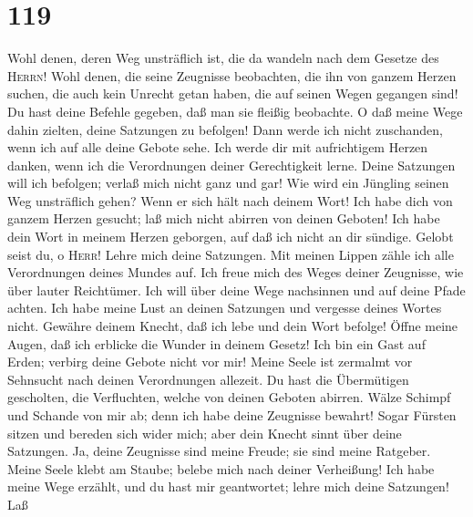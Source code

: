 \hypertarget{section-118}{%
\section{119}\label{section-118}}

 Wohl denen, deren Weg unsträflich ist, die da wandeln
nach dem Gesetze des \textsc{Herrn}!  Wohl denen, die
seine Zeugnisse beobachten, die ihn von ganzem Herzen suchen,
 die auch kein Unrecht getan haben, die auf seinen Wegen
gegangen sind!  Du hast deine Befehle gegeben, daß man sie
fleißig beobachte.  O daß meine Wege dahin zielten, deine
Satzungen zu befolgen!  Dann werde ich nicht zuschanden,
wenn ich auf alle deine Gebote sehe.  Ich werde dir mit
aufrichtigem Herzen danken, wenn ich die Verordnungen deiner
Gerechtigkeit lerne.  Deine Satzungen will ich befolgen;
verlaß mich nicht ganz und gar!  Wie wird ein Jüngling
seinen Weg unsträflich gehen? Wenn er sich hält nach deinem Wort!
 Ich habe dich von ganzem Herzen gesucht; laß mich nicht
abirren von deinen Geboten!  Ich habe dein Wort in meinem
Herzen geborgen, auf daß ich nicht an dir sündige. 
Gelobt seist du, o \textsc{Herr}! Lehre mich deine Satzungen.
 Mit meinen Lippen zähle ich alle Verordnungen deines
Mundes auf.  Ich freue mich des Weges deiner Zeugnisse,
wie über lauter Reichtümer.  Ich will über deine Wege
nachsinnen und auf deine Pfade achten.  Ich habe meine
Lust an deinen Satzungen und vergesse deines Wortes nicht.
 Gewähre deinem Knecht, daß ich lebe und dein Wort
befolge!  Öffne meine Augen, daß ich erblicke die Wunder
in deinem Gesetz!  Ich bin ein Gast auf Erden; verbirg
deine Gebote nicht vor mir!  Meine Seele ist zermalmt vor
Sehnsucht nach deinen Verordnungen allezeit.  Du hast die
Übermütigen gescholten, die Verfluchten, welche von deinen Geboten
abirren.  Wälze Schimpf und Schande von mir ab; denn ich
habe deine Zeugnisse bewahrt!  Sogar Fürsten sitzen und
bereden sich wider mich; aber dein Knecht sinnt über deine Satzungen.
 Ja, deine Zeugnisse sind meine Freude; sie sind meine
Ratgeber.  Meine Seele klebt am Staube; belebe mich nach
deiner Verheißung!  Ich habe meine Wege erzählt, und du
hast mir geantwortet; lehre mich deine Satzungen!  Laß
